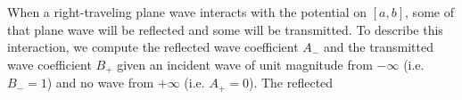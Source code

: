 \documentclass{article}
\newcommand{\schrodinger}{Schr\"{o}dinger}
\begin{document}
When a right-traveling plane wave interacts with the potential on $[a,b]$,
some of that plane wave will be reflected and some will be transmitted.
To describe this interaction, we compute the reflected wave coefficient
$A_{-}$ and the transmitted wave coefficient $B_{+}$ given an incident
wave of unit magnitude from $-\infty$ (i.e. $B_{-} = 1$) and no wave
from $+\infty$ (i.e. $A_{+} = 0$).  The reflected 







  
\end{document}

